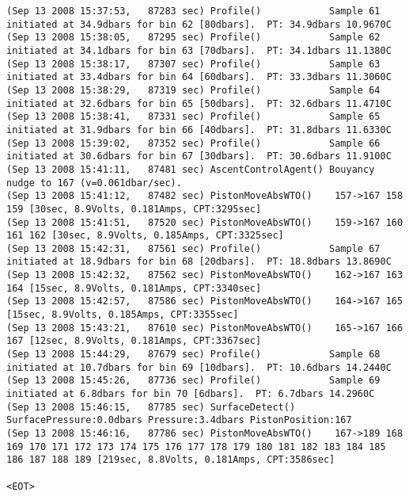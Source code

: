 {\begin{verbatim}
(Sep 13 2008 15:37:53,   87283 sec) Profile()            Sample 61 initiated at 34.9dbars for bin 62 [80dbars].  PT: 34.9dbars 10.9670C
(Sep 13 2008 15:38:05,   87295 sec) Profile()            Sample 62 initiated at 34.1dbars for bin 63 [70dbars].  PT: 34.1dbars 11.1380C
(Sep 13 2008 15:38:17,   87307 sec) Profile()            Sample 63 initiated at 33.4dbars for bin 64 [60dbars].  PT: 33.3dbars 11.3060C
(Sep 13 2008 15:38:29,   87319 sec) Profile()            Sample 64 initiated at 32.6dbars for bin 65 [50dbars].  PT: 32.6dbars 11.4710C
(Sep 13 2008 15:38:41,   87331 sec) Profile()            Sample 65 initiated at 31.9dbars for bin 66 [40dbars].  PT: 31.8dbars 11.6330C
(Sep 13 2008 15:39:02,   87352 sec) Profile()            Sample 66 initiated at 30.6dbars for bin 67 [30dbars].  PT: 30.6dbars 11.9100C
(Sep 13 2008 15:41:11,   87481 sec) AscentControlAgent() Bouyancy nudge to 167 (v=0.061dbar/sec).
(Sep 13 2008 15:41:12,   87482 sec) PistonMoveAbsWTO()    157->167 158 159 [30sec, 8.9Volts, 0.181Amps, CPT:3295sec]
(Sep 13 2008 15:41:51,   87520 sec) PistonMoveAbsWTO()    159->167 160 161 162 [30sec, 8.9Volts, 0.185Amps, CPT:3325sec]
(Sep 13 2008 15:42:31,   87561 sec) Profile()            Sample 67 initiated at 18.9dbars for bin 68 [20dbars].  PT: 18.8dbars 13.8690C
(Sep 13 2008 15:42:32,   87562 sec) PistonMoveAbsWTO()    162->167 163 164 [15sec, 8.9Volts, 0.181Amps, CPT:3340sec]
(Sep 13 2008 15:42:57,   87586 sec) PistonMoveAbsWTO()    164->167 165 [15sec, 8.9Volts, 0.185Amps, CPT:3355sec]
(Sep 13 2008 15:43:21,   87610 sec) PistonMoveAbsWTO()    165->167 166 167 [12sec, 8.9Volts, 0.181Amps, CPT:3367sec]
(Sep 13 2008 15:44:29,   87679 sec) Profile()            Sample 68 initiated at 10.7dbars for bin 69 [10dbars].  PT: 10.6dbars 14.2440C
(Sep 13 2008 15:45:26,   87736 sec) Profile()            Sample 69 initiated at 6.8dbars for bin 70 [6dbars].  PT: 6.7dbars 14.2960C
(Sep 13 2008 15:46:15,   87785 sec) SurfaceDetect()      SurfacePressure:0.0dbars Pressure:3.4dbars PistonPosition:167
(Sep 13 2008 15:46:16,   87786 sec) PistonMoveAbsWTO()    167->189 168 169 170 171 172 173 174 175 176 177 178 179 180 181 182 183 184 185 186 187 188 189 [219sec, 8.8Volts, 0.181Amps, CPT:3586sec]

<EOT>
\end{verbatim}}

